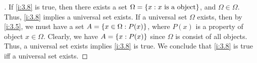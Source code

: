 \begin{proof}[]
  If \cref{i:3.8} is true, then there exists a set \(\Omega = \left\lbrace x : x \text{ is a object}\right\rbrace\), and \(\Omega \in \Omega\).
  Thus, \cref{i:3.8} implies a universal set exists.
  If a universal set \(\Omega\) exists, then by \cref{i:3.5}, we must have a set \(A = \left\lbrace x \in \Omega : P(x)\right\rbrace\), where \(P(x)\) is a property of object \(x \in \Omega\).
  Clearly, we have \(A = \left\lbrace x : P(x)\right\rbrace\) since \(\Omega\) is consist of all objects.
  Thus, a universal set exists implies \cref{i:3.8} is true.
  We conclude that \cref{i:3.8} is true iff a universal set exists.
\end{proof}

